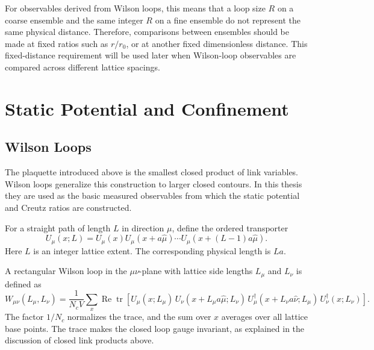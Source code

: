 \documentclass[12pt,a4paper,oneside,numbers=noenddot]{scrreprt}
\newcommand{\latspacing}{a}
\newcommand{\rzero}{r_0}
\begin{document}
For observables derived from Wilson loops, this means that a loop size \(R\) on
a coarse ensemble and the same integer \(R\) on a fine ensemble do not represent
the same physical distance. Therefore, comparisons between ensembles should be
made at fixed ratios such as \(r/\rzero\), or at another fixed dimensionless
distance. This fixed-distance requirement will be used later when Wilson-loop
observables are compared across different lattice spacings.

\section{Static Potential and Confinement}
\label{sec:static-potential-confinement}

\subsection{Wilson Loops}
\label{subsec:wilson-loops}

The plaquette introduced above is the smallest closed product of link
variables. Wilson loops generalize this construction to larger closed contours.
In this thesis they are used as the basic measured observables from which the
static potential and Creutz ratios are constructed.

For a straight path of length \(L\) in direction \(\mu\), define the ordered
transporter
\begin{equation}
  U_\mu(x;L)
  =
  U_\mu(x)
  U_\mu(x+\latspacing\hat\mu)
  \cdots
  U_\mu(x+(L-1)\latspacing\hat\mu).
  \label{eq:straight-transporter}
\end{equation}
Here \(L\) is an integer lattice extent. The corresponding physical length is
\(L\latspacing\).

A rectangular Wilson loop in the \(\mu\nu\)-plane with lattice side lengths
\(L_\mu\) and \(L_\nu\) is defined as
\begin{equation}
  W_{\mu\nu}(L_\mu,L_\nu)
  =
  \frac{1}{N_c V}
  \sum_x
  \operatorname{Re}\operatorname{tr}
  \left[
    U_\mu(x;L_\mu)\,
    U_\nu(x+L_\mu\latspacing\hat\mu;L_\nu)\,
    U_\mu^\dagger(x+L_\nu\latspacing\hat\nu;L_\mu)\,
    U_\nu^\dagger(x;L_\nu)
  \right].
  \label{eq:rectangular-wilson-loop}
\end{equation}
The factor \(1/N_c\) normalizes the trace, and the sum over \(x\) averages over
all lattice base points. The trace makes the closed loop gauge invariant, as
explained in the discussion of closed link products above.
\end{document}

